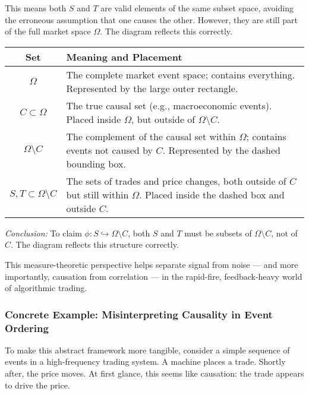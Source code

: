 This means both \( S \) and \( T \) are valid elements of the same subset space, avoiding the erroneous assumption that one causes the other. However, they are still part of the full market space \( \Omega \). The diagram reflects this correctly.

\vspace{1em}
\begin{center}
\renewcommand{\arraystretch}{1.3}
\begin{tabular}{|c|p{8cm}|}
\hline
\textbf{Set} & \textbf{Meaning and Placement} \\
\hline
\( \Omega \) & The complete market event space; contains everything. Represented by the large outer rectangle. \\
\hline
\( C \subset \Omega \) & The true causal set (e.g., macroeconomic events). Placed inside \( \Omega \), but outside of \( \Omega \setminus C \). \\
\hline
\( \Omega \setminus C \) & The complement of the causal set within \( \Omega \); contains events not caused by \( C \). Represented by the dashed bounding box. \\
\hline
\( S, T \subset \Omega \setminus C \) & The sets of trades and price changes, both outside of \( C \) but still within \( \Omega \). Placed inside the dashed box and outside \( C \). \\
\hline
\end{tabular}
\end{center}

\vspace{1em}
\noindent
\textit{Conclusion:} To claim \( \phi: S \hookrightarrow \Omega \setminus C \), both \( S \) and \( T \) must be subsets of \( \Omega \setminus C \), not of \( C \). The diagram reflects this structure correctly.





This measure-theoretic perspective helps separate signal from noise — and more importantly, causation from correlation — in the rapid-fire, feedback-heavy world of algorithmic trading.


\subsubsection*{Concrete Example: Misinterpreting Causality in Event Ordering}

To make this abstract framework more tangible, consider a simple sequence of events in a high-frequency trading system. A machine places a trade. Shortly after, the price moves. At first glance, this seems like causation: the trade appears to drive the price.

